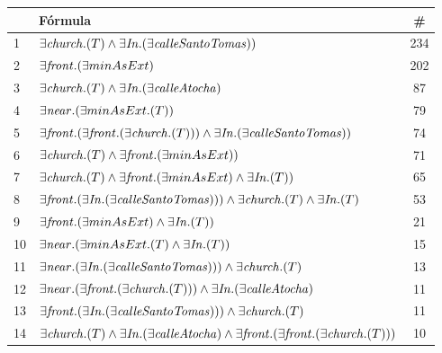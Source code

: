 \begin{table}[h]
\begin{center}
\begin{tabular}{|l|l|c|}
\hline
&F\'ormula			      &  \# \\ \hline \hline

1&$\exists \mathit{church}.(T) \land \exists \mathit{In} .(\exists \mathit{calleSantoTomas}))$ &234 \\ \hline

2&$\exists \mathit{front} . (\exists minAsExt)$ &202 \\ \hline

3&$\exists \mathit{church}.(T) \land \exists \mathit{In} .(\exists \mathit{calleAtocha})$ &87\\ \hline

4&$\exists \mathit{near} .(\exists minAsExt .(T))$ &79\\ \hline

5&$\exists \mathit{front}.(\exists \mathit{front}.(\exists \mathit{church}.(T))) \land \exists \mathit{In} .(\exists \mathit{calleSantoTomas}))$ &74\\ \hline

6&$\exists \mathit{church}.(T) \land \exists\mathit{front} . (\exists minAsExt))$ &71\\ \hline

7&$\exists \mathit{church}.(T) \land \exists\mathit{front} . (\exists minAsExt) \land \exists \mathit{In} .(T))$ &65\\ \hline

8&$\exists \mathit{front}.(\exists \mathit{In} .(\exists \mathit{calleSantoTomas}))) \land \exists \mathit{church}.(T) \land \exists \mathit{In} .(T)$ &53\\ \hline

9&$\exists \mathit{front} . (\exists minAsExt) \land \exists \mathit{In} .(T))$ &21\\ \hline

10&$\exists \mathit{near} .(\exists minAsExt .(T) \land \exists \mathit{In} .(T))$ &15\\ \hline

11&$\exists  \mathit{near}.(\exists \mathit{In} .(\exists \mathit{calleSantoTomas}))) \land \exists \mathit{church}.(T)$ &13\\ \hline

12&$\exists  \mathit{near}.(\exists \mathit{front}.(\exists \mathit{church}.(T))) \land \exists \mathit{In} .(\exists \mathit{calleAtocha})$ &11\\ \hline

13&$\exists \mathit{front}.(\exists \mathit{In} .(\exists \mathit{calleSantoTomas}))) \land \exists \mathit{church}.(T)$ &11\\ \hline

14&$\exists \mathit{church}.(T) \land \exists \mathit{In} .(\exists \mathit{calleAtocha}) \land \exists \mathit{front}.(\exists \mathit{front}.(\exists \mathit{church}.(T)))$ &10\\ \hline


\end{tabular}
\end{center}
\end{table}
